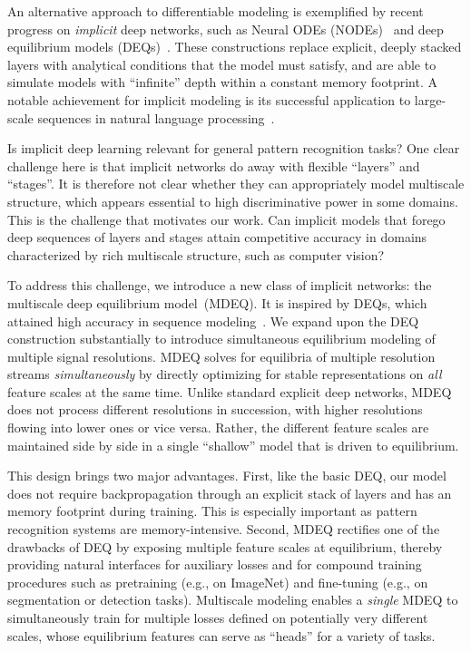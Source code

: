 \documentclass{article}
\begin{document}
An alternative approach to differentiable modeling is exemplified by recent progress on \emph{implicit} deep networks, such as Neural ODEs (NODEs)~\cite{chen2018neural} and deep equilibrium models (DEQs)~\cite{bai2019deep}. These constructions replace explicit, deeply stacked layers with analytical conditions that the model must satisfy, and are able to simulate models with ``infinite'' depth within a constant memory footprint. A notable achievement for implicit modeling is its successful application to large-scale sequences in natural language processing~\cite{bai2019deep}.

Is implicit deep learning relevant for general pattern recognition tasks? One clear challenge here is that implicit networks do away with flexible ``layers'' and ``stages''. It is therefore not clear whether they can appropriately model multiscale structure, which appears essential to high discriminative power in some domains. This is the challenge that motivates our work. Can implicit models that forego deep sequences of layers and stages attain competitive accuracy in domains characterized by rich multiscale structure, such as computer vision?

To address this challenge, we introduce a new class of implicit networks: the multiscale deep equilibrium model~(MDEQ). It is inspired by DEQs, which attained high accuracy in sequence modeling~\cite{bai2019deep}. We expand upon the DEQ construction substantially to introduce simultaneous equilibrium modeling of multiple signal resolutions. MDEQ solves for equilibria of multiple resolution streams \emph{simultaneously} by directly optimizing for stable representations on \emph{all} feature scales at the same time. Unlike standard explicit deep networks, MDEQ does not process different resolutions in succession, with higher resolutions flowing into lower ones or vice versa. Rather, the different feature scales are maintained side by side in a single ``shallow'' model that is driven to equilibrium.

This design brings two major advantages. First, like the basic DEQ, our model does not require backpropagation through an explicit stack of layers and has an  memory footprint during training. This is especially important as pattern recognition systems are memory-intensive.
Second, MDEQ rectifies one of the drawbacks of DEQ by exposing multiple feature scales at equilibrium, thereby providing natural interfaces for auxiliary losses and for compound training procedures such as pretraining (e.g., on ImageNet) and fine-tuning (e.g., on segmentation or detection tasks). Multiscale modeling enables a \emph{single} MDEQ to simultaneously train for multiple losses defined on potentially very different scales, whose equilibrium features can serve as ``heads'' for a variety of tasks.
\end{document}

